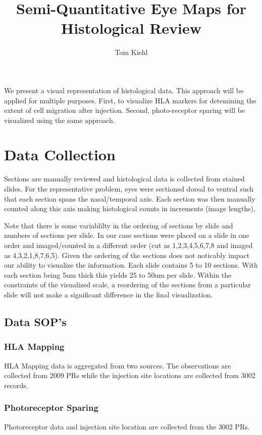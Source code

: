 \documentclass{article}
\title{Semi-Quantitative Eye Maps for Histological Review}
\author{Tom Kiehl}
\begin{document}

\maketitle{}



\abstract{}
We present a visual representation of histological data. This approach will be applied for multiple purposes. First, to visualize HLA markers for detemining the extent of cell migration after injection. Second, photo-receptor sparing will be visualized using the same approach.


\section{Data Collection}
Sections are manually reviewed and histological data is collected from stained slides. For the representative problem, eyes were sectioned dorsal to ventral such that each section spans the nasal/temporal axis. Each section was then manually counted along this axis making histological counts in increments (image lengths).

Note that there is some variablilty in the ordering of sections by slide and numbers of sections per slide. In our case sections were placed on a slide in one order and imaged/counted in a different order (cut as 1,2,3,4,5,6,7,8 and imaged as 4,3,2,1,8,7,6,5). Given the ordering of the sections does not noticably impact our ability to visualize the information. Each slide contains 5 to 10 sections. With each section being 5um thick this yields 25 to 50um per slide. Within the constraints of the visualized scale, a reordering of the sections from a particular slide will not make a significant difference in the final visualization.

\subsection{Data SOP's}
\subsubsection{HLA Mapping}
HLA Mapping data is aggregated from two sources. The observations are collected from 2009 PRs while the injection site locations are collected from 3002 records.
\subsubsection{Photoreceptor Sparing}
Photoreceptor data and injection site location are collected from the 3002 PRs.
\end{document}
